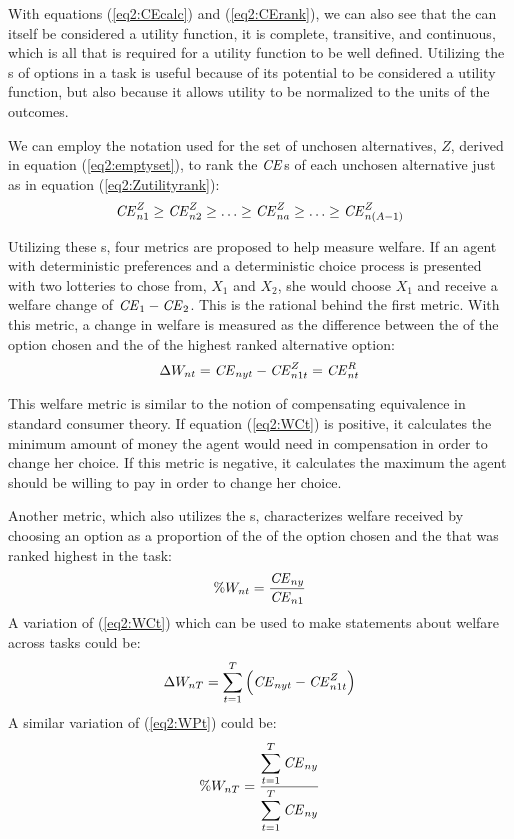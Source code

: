 \documentclass[../main.tex]{subfiles}
\begin{document}
With equations (\ref{eq2:CEcalc}) and (\ref{eq2:CErank}), we can also see that the {\CE} can itself be considered a utility function, it is complete, transitive, and continuous, which is all that is required for a utility function to be well defined.
Utilizing the {\CE}s of options in a task is useful because of its potential to be considered a utility function, but also because it allows utility to be normalized to the units of the outcomes.

We can employ the notation used for the set of unchosen alternatives, $Z$, derived in equation (\ref{eq2:emptyset}), to rank the ${\mathit{CE}}$s of each unchosen alternative just as in equation (\ref{eq2:Zutilityrank}):
\begin{equation}
	\label{eq2:CEZ}
	{\ensuremath{\mathit{CE}}}_{n1}^Z \geq {\ensuremath{\mathit{CE}}}_{n2}^Z \geq \ldots \geq {\ensuremath{\mathit{CE}}}_{na}^Z \geq \ldots \geq {\ensuremath{\mathit{CE}}}_{n(A-1)}^Z
\end{equation}

Utilizing these {\CE}s, four metrics are proposed to help measure welfare.
If an agent with deterministic preferences and a deterministic choice process is presented with two lotteries to chose from, $X_1$ and $X_2$, she would choose $X_1$ and receive a welfare change of ${\mathit{CE}}_1 - {\mathit{CE}}_2$.
This is the rational behind the first metric.
With this metric, a change in welfare is measured as the difference between the {\CE} of the option chosen and the {\CE} of the highest ranked alternative option:
\begin{equation}
	\label{eq2:WCt}
	\Delta W_{nt} = {\mathit{CE}}_{nyt} - {\mathit{CE}}_{n1t}^Z = {\mathit{CE}}_{nt}^R
\end{equation}

This welfare metric is similar to the notion of compensating equivalence in standard consumer theory.
If equation (\ref{eq2:WCt}) is positive, it calculates the minimum amount of money the agent would need in compensation in order to change her choice.
If this metric is negative, it calculates the maximum the agent should be willing to pay in order to change her choice.

Another metric, which also utilizes the {\CE}s, characterizes welfare received by choosing an option as a proportion of the {\CE} of the option chosen and the {\CE} that was ranked highest in the task:
\begin{equation}
	\label{eq2:WPt}
	\%W_{nt} = \frac{ {\mathit{CE}}_{ny} }{ {\mathit{CE}}_{n1} }
\end{equation}
\noindent A variation of (\ref{eq2:WCt}) which can be used to make statements about welfare across tasks could be:
\begin{equation}
	\label{eq2:WCT}
	\Delta W_{nT} = \sum_{t=1}^T \left( {\mathit{CE}}_{nyt} - {\mathit{CE}}_{n1t}^Z \right)
\end{equation}
\noindent A similar variation of (\ref{eq2:WPt}) could be:
\begin{equation}
	\label{eq2:WPT}
	\%W_{nT} = \frac{\displaystyle\sum_{t=1}^{T} {\mathit{CE}}_{ny} }{\displaystyle\sum_{t=1}^{T} {\mathit{CE}}_{ny}}
\end{equation}
\end{document}
